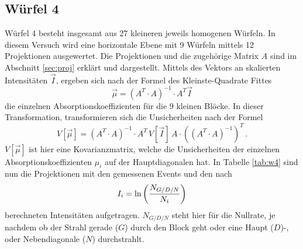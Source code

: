   \subsection{Würfel 4}
    Würfel 4 besteht insgesamt aus 27 kleineren jeweils homogenen Würfeln.
    In diesem Versuch wird eine horizontale Ebene mit 9 Würfeln mittels 12 Projektionen ausgewertet.
    Die Projektionen und die zugehörige Matrix $A$ sind im Abschnitt \ref{sec:proj} erklärt und dargestellt.
    Mittels des Vektors an skalierten Intensitäten $\vec{I}$, ergeben sich nach der Formel des Kleinste-Quadrate Fittes
    \begin{equation}
      \vec{\mu} = \left( A^T \cdot A \right)^{-1} \cdot A^T \vec{I}
    \end{equation}
    die einzelnen Absorptionskoeffizienten für die 9 kleinen Blöcke.
    In dieser Transformation, transformieren sich die Unsicherheiten nach der Formel
    \begin{equation}
      V[\vec{\mu}] = \left( A^T \cdot A \right)^{-1} \cdot A^T \, V[\vec{I}] \, A \cdot \left( \left( A^T \cdot A \right)^{-1} \right)^T \,.
    \end{equation}
    $V[\vec{\mu}]$ ist hier eine Kovarianzmatrix, welche die Unsicherheiten der einzelnen Absorptionskoeffizienten $\mu_i$ auf der Hauptdiagonalen hat.
    In Tabelle  \ref{tab:w4} sind nun die Projektionen mit den gemessenen Events und den nach
    \begin{equation}
      I_i = \text{ln}\left( \frac{N_{G/D/N}}{N_i} \right)
    \end{equation}
    berechneten Intensitäten aufgetragen. $N_{G/D/N}$ steht hier für die Nullrate, je nachdem ob der Strahl gerade ($G$) durch den Block geht oder eine Haupt ($D$)-, oder Nebendiagonale ($N$) durchstrahlt.
